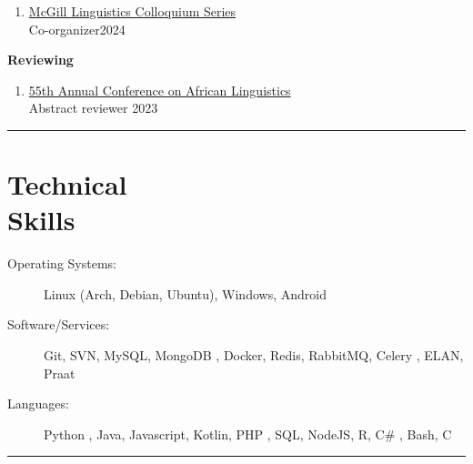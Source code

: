 \documentclass[margin,line]{resume}
\begin{document}
\begin{resume}
\begin{enumerate}[-, leftmargin=1em, topsep=4pt]
		\item[] \href{https://www.mcgill.ca/linguistics/events/colloquium-series}{McGill Linguistics Colloquium Series}\\
		      \hphantom{...}Co-organizer\hfill 2024
	\end{enumerate}

	\textbf{Reviewing}
	\begin{enumerate}[-, leftmargin=1em, topsep=4pt]
		\item[]  \href{https://acal55.mull-lab.org/}{55th Annual Conference on African Linguistics}\\
		      \hphantom{...}Abstract reviewer \hfill 2023
	\end{enumerate}

	\vspace{-1em}\rule{\textwidth}{0.4pt}


	\section{\mysidestyle Technical\\Skills}\vspace{2mm}
	\begin{description}
		\item[Operating Systems:] Linux (Arch, Debian, Ubuntu), Windows, Android
		\item[Software/Services:] Git, SVN, MySQL, MongoDB%
		      , Docker, Redis, RabbitMQ, Celery%
		      , ELAN, Praat%
		\item[Languages:] Python%
		      , Java, Javascript, Kotlin, PHP%
		      , SQL, NodeJS, R, C\#%
		      , Bash, C%
	\end{description}

	\vspace{-1.1em}\rule{\textwidth}{0.4pt}



\end{resume}
\end{document}

